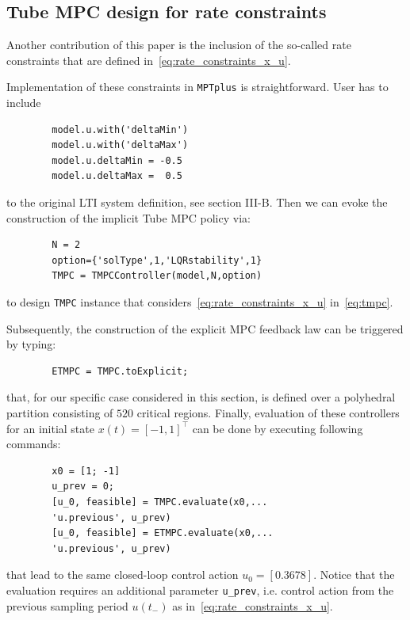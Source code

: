 \documentclass[letterpaper, 10 pt, conference]{ieeeconf}
\begin{document}
	
	
	\subsection{Tube MPC design for rate constraints}
	\label{sec:mptplus_tube_mpc_delta_u}
	
	Another contribution of this paper is the inclusion of the so-called rate constraints that are defined in~\eqref{eq:rate_constraints_x_u}.
	
	Implementation of these constraints in \texttt{MPTplus} is straightforward. User has to include 
	\begin{verbatim}
		model.u.with('deltaMin')
		model.u.with('deltaMax')
		model.u.deltaMin = -0.5
		model.u.deltaMax =  0.5
	\end{verbatim}
	to the original LTI system definition, see section III-B. Then we can evoke the construction of the implicit Tube MPC policy via:
	\begin{verbatim}
		N = 2
		option={'solType',1,'LQRstability',1}
		TMPC = TMPCController(model,N,option)
	\end{verbatim}
	to design \texttt{TMPC} instance that considers~\eqref{eq:rate_constraints_x_u} in~\eqref{eq:tmpc}.
	
	Subsequently, the construction of the explicit MPC feedback law can be triggered by typing:
	\begin{verbatim}
		ETMPC = TMPC.toExplicit;
	\end{verbatim}
	that, for our specific case considered in this section, is defined over a polyhedral partition consisting of $520$ critical regions.
	Finally, evaluation of these controllers for an initial state $x(t) = [-1, 1]^\top$ can be done by executing following commands:
	\begin{verbatim}
		x0 = [1; -1]
		u_prev = 0;
		[u_0, feasible] = TMPC.evaluate(x0,...
		'u.previous', u_prev)
		[u_0, feasible] = ETMPC.evaluate(x0,...
		'u.previous', u_prev)
	\end{verbatim}
	that lead to the same closed-loop control action $u_0 = [0.3678]$.
	Notice that the evaluation requires an additional parameter \verb|u_prev|, i.e. control action from the previous sampling period $u(t_{-})$ as in~\eqref{eq:rate_constraints_x_u}.
	
\end{document}
